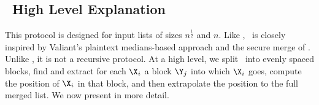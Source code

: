 \subsection{\sqrtmerge\ High Level Explanation}\label{sec:sqrtmergeoverview}

This protocol is designed for input lists of sizes $n^{\frac{1}{2}}$ and $n$. 
Like \ourprotocoltwo, \sqrtmergeprotocol\ is closely inspired by Valiant's \cite{JC:Val75} plaintext medians-based approach and the secure merge of \cite{EPRINT:BBDLO22}. Unlike \ourprotocoltwo, it is not a recursive protocol.
At a high level, we split \Y\ into evenly spaced blocks, find and extract for each $\X_i$ a block $\Y_j$ into which $\X_i$ goes, compute the position of $\X_i$ in that block, and then extrapolate the position to the full merged list. We now present in more detail.

